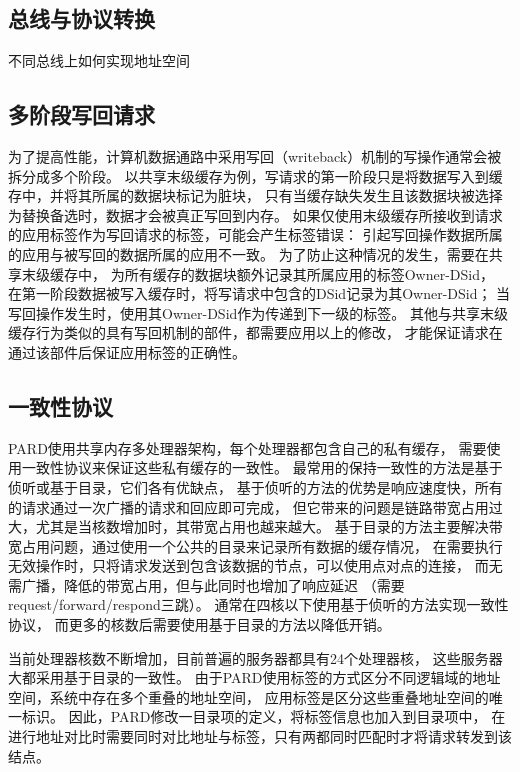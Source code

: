 \subsection{总线与协议转换}

不同总线上如何实现地址空间




\subsection{多阶段写回请求}
\label{chap:labeladdrspace:propagation:cache}

为了提高性能，计算机数据通路中采用写回（writeback）机制的写操作通常会被拆分成多个阶段。
以共享末级缓存为例，写请求的第一阶段只是将数据写入到缓存中，并将其所属的数据块标记为脏块，
只有当缓存缺失发生且该数据块被选择为替换备选时，数据才会被真正写回到内存。
如果仅使用末级缓存所接收到请求的应用标签作为写回请求的标签，可能会产生标签错误：
引起写回操作数据所属的应用与被写回的数据所属的应用不一致。
为了防止这种情况的发生，需要在共享末级缓存中，
为所有缓存的数据块额外记录其所属应用的标签Owner-DSid，
在第一阶段数据被写入缓存时，将写请求中包含的DSid记录为其Owner-DSid；
当写回操作发生时，使用其Owner-DSid作为传递到下一级的标签。
其他与共享末级缓存行为类似的具有写回机制的部件，都需要应用以上的修改，
才能保证请求在通过该部件后保证应用标签的正确性。


\subsection{一致性协议}

PARD使用共享内存多处理器架构，每个处理器都包含自己的私有缓存，
需要使用一致性协议来保证这些私有缓存的一致性。
最常用的保持一致性的方法是基于侦听或基于目录，它们各有优缺点，
基于侦听的方法的优势是响应速度快，所有的请求通过一次广播的请求和回应即可完成，
但它带来的问题是链路带宽占用过大，尤其是当核数增加时，其带宽占用也越来越大。
基于目录的方法主要解决带宽占用问题，通过使用一个公共的目录来记录所有数据的缓存情况，
在需要执行无效操作时，只将请求发送到包含该数据的节点，可以使用点对点的连接，
而无需广播，降低的带宽占用，但与此同时也增加了响应延迟
（需要request/forward/respond三跳）。
通常在四核以下使用基于侦听的方法实现一致性协议，
而更多的核数后需要使用基于目录的方法以降低开销。

当前处理器核数不断增加，目前普遍的服务器都具有24个处理器核，
这些服务器大都采用基于目录的一致性。
由于PARD使用标签的方式区分不同逻辑域的地址空间，系统中存在多个重叠的地址空间，
应用标签是区分这些重叠地址空间的唯一标识。
因此，PARD修改一目录项的定义，将标签信息也加入到目录项中，
在进行地址对比时需要同时对比地址与标签，只有两都同时匹配时才将请求转发到该结点。

